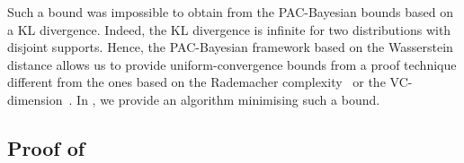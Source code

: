 \documentclass{article}
\begin{document}
Such a bound was impossible to obtain from the PAC-Bayesian bounds based on a KL divergence.
Indeed, the KL divergence is infinite for two distributions with disjoint supports. 
Hence, the PAC-Bayesian framework based on the Wasserstein distance allows us to provide uniform-convergence bounds from a proof technique different from the ones based on the Rademacher complexity~\cite{koltchinskii2000rademacher,bartlett2001rademacher,bartlett2002rademacher} or the VC-dimension~\cite{vapnik1968uniform,vapnik1974theory}.
In , we provide an algorithm minimising such a bound.

\subsection{Proof of }
\label{sec:proof-online-ht}
\end{document}
